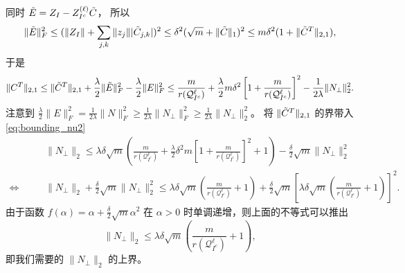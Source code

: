 \documentclass[main.tex]{subfiles}
\begin{document}
同时 $\tilde{E} = Z_I - Z_{I^c}^{(\ell)}\tilde{C}$， 所以 
$$\|\tilde{E}\|_F^2 \leq (\|Z_I\|+\sum_{j,k} \|z_j\||\tilde{C}_{j,k}|)^2
\leq \delta^2 (\sqrt{m} + \|\tilde{C}\|_1)^2\leq m \delta^2(1+ \|\tilde{C}^T\|_{2,1}),$$
于是
$$\|C^T\|_{2,1} \leq \|\tilde{C}^T\|_{2,1} + \frac{\lambda}{2}\|\tilde{E}\|_F^2-\frac{\lambda}{2}\|E\|_F^2
\leq \frac{m}{r{(\mathcal{Q}_{I^c}^{\ell})}}+\frac{\lambda}{2}m\delta^2
\left[1+\frac{m}{r{(\mathcal{Q}_{I^c}^{\ell})}}\right]^2-\frac{1}{2\lambda}\|N_{\perp}\|_2^2.$$
注意到 $\frac{\lambda}{2}\|E\|_F^2=\frac{1}{2\lambda}\|N\|_F^2
\geq\frac{1}{2\lambda}\|N_{\perp}\|_F^2 \geq\frac{1}{2\lambda}\|N_{\perp}\|_2^2$。
将 $\|\tilde{C}^T\|_{2,1}$ 的界带入 \eqref{eq:bounding_nu2} 
\begin{align*}
  &&\;&\|N_{\perp}\|_2 \leq \lambda \delta \sqrt{m} 
  \left(\frac{m}{r(\mathcal{Q}_{I^c}^{\ell})}+\frac{\lambda}{2}\delta^2m
  \left[1+\frac{m}{r(\mathcal{Q}_{I^c}^{\ell})}\right]^2+1\right)
  -\frac{\delta}{2}\sqrt{m}\|N_{\perp}\|_2^2\\
  \Leftrightarrow&&\;
  &\|N_{\perp}\|_2+\frac{\delta}{2}\sqrt{m}\|N_{\perp}\|_2^2\leq
  \lambda\delta\sqrt{m}\left(\frac{m}{r(\mathcal{Q}_{I^c}^{\ell})}+1\right)+
  \frac{\delta}{2}\sqrt{m} \left[\lambda\delta\sqrt{m}
  \left(\frac{m}{r(\mathcal{Q}_{I^c}^{\ell})}+1\right)\right]^2 .
\end{align*}
由于函数 $f(\alpha)=\alpha+\frac{\delta}{2}\sqrt{m}\alpha^2$ 在 $\alpha>0$
时单调递增，则上面的不等式可以推出
\begin{equation}\label{eq:nu2_bound}
  \|N_{\perp}\|_2 \leq \lambda\delta\sqrt{m}\left(\frac{m}{r(\mathcal{Q}_{I^c}^{\ell})}+1\right),
\end{equation}
即我们需要的 $\|N_{\perp}\|_2$ 的上界。
\end{document}
